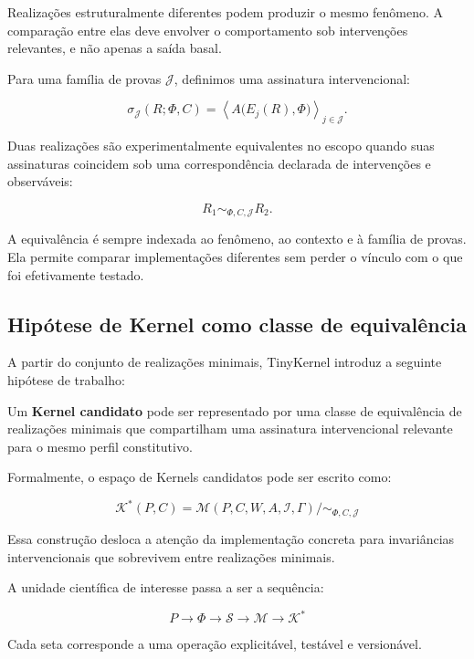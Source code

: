 \documentclass[11pt,a4paper]{article}
\begin{document}
Realizações estruturalmente diferentes podem produzir o mesmo fenômeno. A comparação
entre elas deve envolver o comportamento sob intervenções relevantes, e não apenas a
saída basal.

Para uma família de provas $\mathcal J$, definimos uma assinatura intervencional:

\[
\sigma_{\mathcal J}(R;\Phi,C)
=
\left\langle
A\bigl(E_j(R),\Phi\bigr)
\right\rangle_{j\in\mathcal J}.
\]

Duas realizações são experimentalmente equivalentes no escopo quando suas assinaturas
coincidem sob uma correspondência declarada de intervenções e observáveis:

\[
R_1\sim_{\Phi,C,\mathcal J}R_2.
\]

A equivalência é sempre indexada ao fenômeno, ao contexto e à família de provas.
Ela permite comparar implementações diferentes sem perder o vínculo com o que foi
efetivamente testado.

\subsection{Hipótese de Kernel como classe de equivalência}

A partir do conjunto de realizações minimais, TinyKernel introduz a seguinte hipótese
de trabalho:

\begin{thesisbox}[Hipótese K]
Um \textbf{Kernel candidato} pode ser representado por uma classe de equivalência de
realizações minimais que compartilham uma assinatura intervencional relevante para o
mesmo perfil constitutivo.
\end{thesisbox}

Formalmente, o espaço de Kernels candidatos pode ser escrito como:

\[
\boxed{
\mathcal K^{\ast}(P,C)
=
\mathcal M(P,C,W,A,\mathcal I,\Gamma)
\big/
\sim_{\Phi,C,\mathcal J}
}
\]

Essa construção desloca a atenção da implementação concreta para invariâncias
intervencionais que sobrevivem entre realizações minimais.

A unidade científica de interesse passa a ser a sequência:

\[
\boxed{
P
\rightarrow
\Phi
\rightarrow
\mathcal S
\rightarrow
\mathcal M
\rightarrow
\mathcal K^{\ast}
}
\]

Cada seta corresponde a uma operação explicitável, testável e versionável.

\end{document}
